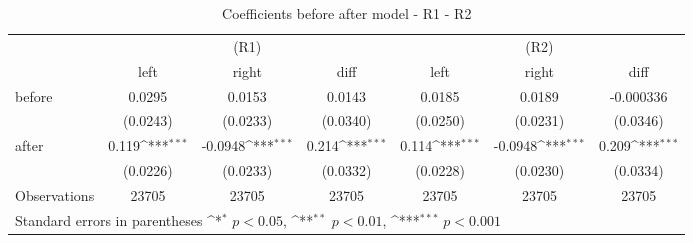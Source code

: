 \begin{table}[!ht]\centering \footnotesize
\def\sym#1{\ifmmode^{#1}\else\(^{#1}\)\fi}
\caption{Coefficients before after model - R1 - R2}
\begin{tabular}{l*{6}{c}}
\hline\hline
                    &\multicolumn{3}{c}{(R1)}&\multicolumn{3}{c}{(R2)}\\
                    &\multicolumn{1}{c}{left}&\multicolumn{1}{c}{right}&\multicolumn{1}{c}{diff}&\multicolumn{1}{c}{left}&\multicolumn{1}{c}{right}&\multicolumn{1}{c}{diff}\\
\hline
before              &      0.0295         &      0.0153         &      0.0143         &      0.0185         &      0.0189         &   -0.000336         \\
                    &    (0.0243)         &    (0.0233)         &    (0.0340)         &    (0.0250)         &    (0.0231)         &    (0.0346)         \\
[0.5em]
after               &       0.119\sym{***}&     -0.0948\sym{***}&       0.214\sym{***}&       0.114\sym{***}&     -0.0948\sym{***}&       0.209\sym{***}\\
                    &    (0.0226)         &    (0.0233)         &    (0.0332)         &    (0.0228)         &    (0.0230)         &    (0.0334)         \\
\hline
Observations        &       23705         &       23705         &       23705         &       23705         &       23705         &       23705         \\
\hline\hline
\multicolumn{7}{l}{ Standard errors in parentheses \sym{*} \(p<0.05\), \sym{**} \(p<0.01\), \sym{***} \(p<0.001\)}\\
\end{tabular}
\end{table}
